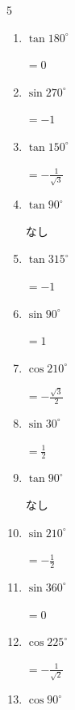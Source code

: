 \begin{multicols}{5}
\begin{enumerate}
        $\displaystyle =-\frac{1}{2}$

  \item $\displaystyle \tan{180^\circ}$

        $\displaystyle =0$

  \item $\displaystyle \sin{270^\circ}$

        $\displaystyle =-1$

  \item $\displaystyle \tan{150^\circ}$

        $\displaystyle =-\frac{1}{\sqrt{3}}$

  \item $\displaystyle \tan{90^\circ}$

        $\displaystyle なし$

  \item $\displaystyle \tan{315^\circ}$

        $\displaystyle =-1$

  \item $\displaystyle \sin{90^\circ}$

        $\displaystyle =1$

  \item $\displaystyle \cos{210^\circ}$

        $\displaystyle =-\frac{\sqrt{3}}{2}$

  \item $\displaystyle \sin{30^\circ}$

        $\displaystyle =\frac{1}{2}$

  \item $\displaystyle \tan{90^\circ}$

        $\displaystyle なし$

\columnbreak %

  \item $\displaystyle \sin{210^\circ}$

        $\displaystyle =-\frac{1}{2}$

  \item $\displaystyle \sin{360^\circ}$

        $\displaystyle =0$

  \item $\displaystyle \cos{225^\circ}$

        $\displaystyle =-\frac{1}{\sqrt{2}}$

  \item $\displaystyle \cos{90^\circ}$


\end{enumerate}
\end{multicols}

